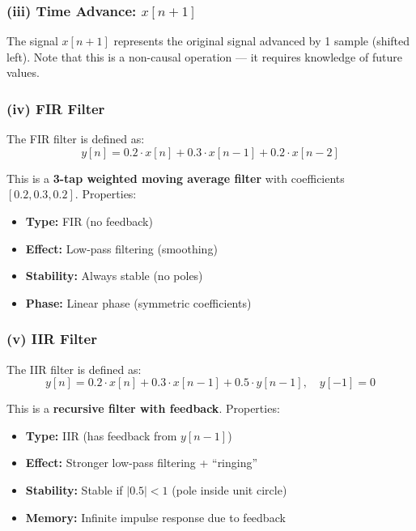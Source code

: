 \documentclass[12pt,a4paper]{article}
\begin{document}
\subsubsection{(iii) Time Advance: $x[n+1]$}

The signal $x[n+1]$ represents the original signal advanced by 1 sample (shifted left). Note that this is a non-causal operation --- it requires knowledge of future values.

\subsubsection{(iv) FIR Filter}

The FIR filter is defined as:
\begin{equation}
    y[n] = 0.2 \cdot x[n] + 0.3 \cdot x[n-1] + 0.2 \cdot x[n-2]
\end{equation}

This is a \textbf{3-tap weighted moving average filter} with coefficients $[0.2, 0.3, 0.2]$. Properties:
\begin{itemize}
    \item \textbf{Type:} FIR (no feedback)
    \item \textbf{Effect:} Low-pass filtering (smoothing)
    \item \textbf{Stability:} Always stable (no poles)
    \item \textbf{Phase:} Linear phase (symmetric coefficients)
\end{itemize}

\subsubsection{(v) IIR Filter}

The IIR filter is defined as:
\begin{equation}
    y[n] = 0.2 \cdot x[n] + 0.3 \cdot x[n-1] + 0.5 \cdot y[n-1], \quad y[-1] = 0
\end{equation}

This is a \textbf{recursive filter with feedback}. Properties:
\begin{itemize}
    \item \textbf{Type:} IIR (has feedback from $y[n-1]$)
    \item \textbf{Effect:} Stronger low-pass filtering + ``ringing''
    \item \textbf{Stability:} Stable if $|0.5| < 1$ (pole inside unit circle)
    \item \textbf{Memory:} Infinite impulse response due to feedback
\end{itemize}
\end{document}
